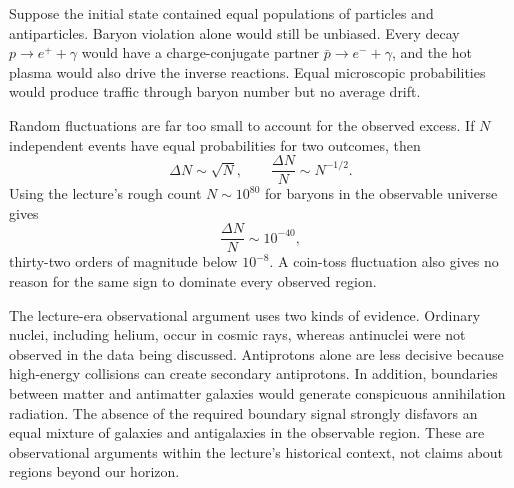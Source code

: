 Suppose the initial state contained equal populations of particles and antiparticles. Baryon violation alone would still be unbiased. Every decay \(p\to e^++\gamma\) would have a charge-conjugate partner \(\bar p\to e^-+\gamma\), and the hot plasma would also drive the inverse reactions. Equal microscopic probabilities would produce traffic through baryon number but no average drift.

\begin{classroomqa}
\end{classroomqa}

Random fluctuations are far too small to account for the observed excess. If \(N\) independent events have equal probabilities for two outcomes, then
\begin{equation}
\Delta N\sim\sqrt N,
\qquad
\frac{\Delta N}{N}\sim N^{-1/2}.
\end{equation}
Using the lecture's rough count \(N\sim10^{80}\) for baryons in the observable universe gives
\begin{equation}
\frac{\Delta N}{N}\sim10^{-40},
\end{equation}
thirty-two orders of magnitude below \(10^{-8}\). A coin-toss fluctuation also gives no reason for the same sign to dominate every observed region.

\begin{classroomqa}
\end{classroomqa}

The lecture-era observational argument uses two kinds of evidence. Ordinary nuclei, including helium, occur in cosmic rays, whereas antinuclei were not observed in the data being discussed. Antiprotons alone are less decisive because high-energy collisions can create secondary antiprotons. In addition, boundaries between matter and antimatter galaxies would generate conspicuous annihilation radiation. The absence of the required boundary signal strongly disfavors an equal mixture of galaxies and antigalaxies in the observable region. These are observational arguments within the lecture's historical context, not claims about regions beyond our horizon.

